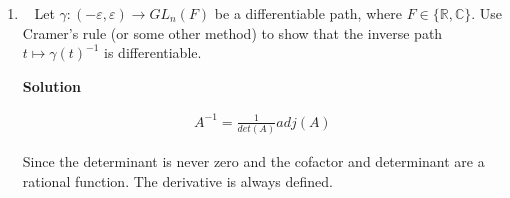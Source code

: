 \documentclass[11pt]{article}
\newcommand\score[1]{\marginpar{\vspace{-2ex}\color{blue}{#1/3}}\hspace{-1ex}}
\newcommand\0{\mathbf{0}}
\newcommand\CC{\mathbb{C}}
\newcommand\RR{\mathbb{R}}
\newcommand\GL{\mathit{GL}}
\newcommand\<{\langle}
\renewcommand\>{\rangle}
\begin{document}
\begin{enumerate}
\textbf{Solution}

Claim 1: $\mathfrak{su}_{n} \subseteq \mathfrak{u}_{n} \cap \mathfrak{sl}_{n}$

This is trivially true by defintion of the $SU$.

Claim 2: $ \mathfrak{u}_{n} \cap \mathfrak{sl}_{n} \subseteq \mathfrak{su}_{n}$

Take $A \in \mathfrak{u}_{n} \cap \mathfrak{sl}_{n}$.

Take the path realization of A. This path is in both $U_n$ and $SL_{n}$(By lecture 16 and lecture 17) and therefore 
is also in $SU_{n}$. So $e^{tA}$ is both in $U_n$ and $SL_n$.

\item\ \score{}%
Let $\gamma: ( -\varepsilon, \varepsilon ) \to \GL_n(F)$ be a
differentiable path, where $F \in \{\RR,\CC\}$.  Use Cramer's rule (or
some other method) to show that the inverse path $t \mapsto
\gamma(t)^{-1}$ is differentiable.

\textbf{Solution}

\begin{align*}
  A^{-1}=\frac{1}{det(A)}adj(A)
\end{align*}

Since the determinant is never zero and the cofactor and determinant are a rational function. The
derivative is always defined.

\end{enumerate}



\end{document}
